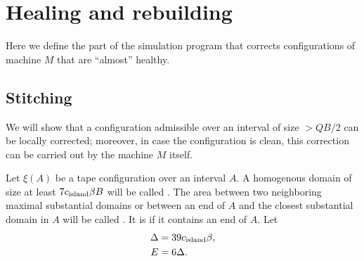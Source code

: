 \documentclass[11pt]{memoir}
\theoremstyle{definition} %
\def\B{B}
\newcommand{\E}{E} %
\newcommand{\Q}{Q} %
\newcommand{\cns}[1]{c_{\textrm{\upshape #1}}}
\begin{document}

\section{Healing and rebuilding}\label{sec:healing}

Here we define the part of the simulation program that
corrects configurations of machine \( M \) that are ``almost'' healthy.

\subsection{Stitching}\label{sec:stitching}

We will show that a configuration admissible over an interval of size \( >\Q\B/2 \)
can be locally corrected;
moreover, in case the configuration is clean, this correction
can be carried out by the machine \( M \) itself.

\begin{definition}\label{def:substantial}
Let \( \xi(A) \) be a tape configuration over an interval \( A \).
A homogenous domain of size at least \( 7\cns{island}\beta\B \)
will be called .
The area between two neighboring maximal
substantial domains or between an end of \( A \) and the closest substantial domain in \( A \)
will be called .
It is  if it contains an end of \( A \).
  Let
 \begin{align*}
     \Delta &= 39\cns{island}\beta, %
\\  \E  &= 6\Delta. %
 \end{align*}
\end{definition}
\end{document}
